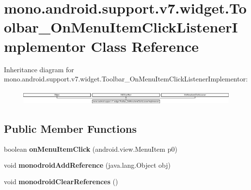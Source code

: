 \hypertarget{classmono_1_1android_1_1support_1_1v7_1_1widget_1_1_toolbar___on_menu_item_click_listener_implementor}{}\section{mono.\+android.\+support.\+v7.\+widget.\+Toolbar\+\_\+\+On\+Menu\+Item\+Click\+Listener\+Implementor Class Reference}
\label{classmono_1_1android_1_1support_1_1v7_1_1widget_1_1_toolbar___on_menu_item_click_listener_implementor}
Inheritance diagram for mono.\+android.\+support.\+v7.\+widget.\+Toolbar\+\_\+\+On\+Menu\+Item\+Click\+Listener\+Implementor\+:\begin{figure}[H]
\begin{center}
\leavevmode
\includegraphics[height=0.801144cm]{classmono_1_1android_1_1support_1_1v7_1_1widget_1_1_toolbar___on_menu_item_click_listener_implementor}
\end{center}
\end{figure}
\subsection*{Public Member Functions}
\begin{DoxyCompactItemize}
\item 
\mbox{\label{classmono_1_1android_1_1support_1_1v7_1_1widget_1_1_toolbar___on_menu_item_click_listener_implementor_abe3c4f78338e12e9652ab414b15582d9}} 
boolean {\bfseries on\+Menu\+Item\+Click} (android.\+view.\+Menu\+Item p0)
\item 
\mbox{\label{classmono_1_1android_1_1support_1_1v7_1_1widget_1_1_toolbar___on_menu_item_click_listener_implementor_a6c66afd38fc5d57a713c37f2059db0f0}} 
void {\bfseries monodroid\+Add\+Reference} (java.\+lang.\+Object obj)
\item 
\mbox{\label{classmono_1_1android_1_1support_1_1v7_1_1widget_1_1_toolbar___on_menu_item_click_listener_implementor_a9e539eca7d6aaa4b43bd92a24f3ffe84}} 
void {\bfseries monodroid\+Clear\+References} ()
\end{DoxyCompactItemize}
